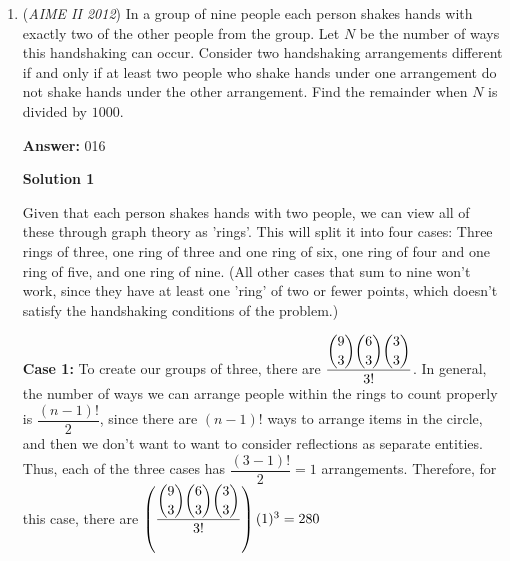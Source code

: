 \begin{enumerate}
By symmetry, we have\begin{align*}\sum_{k=1}^{4}(CE_k)^2&=\sum_{k=1}^{2}\left(2x_k^2+2y_k^2-3\sqrt{37}y_k-3\sqrt{111}x_k+333\right)\\&=710-3\sqrt{37}(y_1+y_2)-3\sqrt{111}(x_1+x_2)\tag{1}\end{align*}
Subtracting the equation of $\omega$ from the equation of $\Omega$, we see that 
 \[-\sqrt{111}x-3\sqrt{37}y+\frac{111}{4}+\frac{333}{4}=100\iff \sqrt{111}x+3\sqrt{37}y=11\]Obtaining the expression for $x^2,y^2$ and substituting them back to the equation of $\omega$, we have\begin{gather*}\frac{4}{3}x^2-\frac{22\sqrt{111}}{333}x+C_1=0\\4y^2-\frac{66\sqrt{37}}{111}y+C_2=0\end{gather*}Hence, by Vieta's formula,
 \[x_1+x_2=\frac{11\sqrt{111}}{222},\quad y_1+y_2=\frac{33\sqrt{37}}{222}\]By $(1)$, we have
 \[\sum_{k=1}^{4}(CE_k)^2=710-3\sqrt{37}\cdot \frac{33\sqrt{37}}{222}-3\sqrt{111}\cdot\frac{11\sqrt{111}}{222}=\boxed{677}\]



	\item (\textit{AIME II 2012}) In a group of nine people each person shakes hands with exactly two of the other people from the group. Let $N$ be the number of ways this handshaking can occur. Consider two handshaking arrangements different if and only if at least two people who shake hands under one arrangement do not shake hands under the other arrangement. Find the remainder when $N$ is divided by $1000$.


 
 \textbf{Answer: }016



\textbf{Solution 1}

Given that each person shakes hands with two people, we can view all of these through graph theory as 'rings'.  This will split it into four cases:  Three rings of three, one ring of three and one ring of six, one ring of four and one ring of five, and one ring of nine. (All other cases that sum to nine won't work, since they have at least one 'ring' of two or fewer points, which doesn't satisfy the handshaking conditions of the problem.)

 \textbf{Case 1:}   To create our groups of three, there are $\dfrac{\dbinom{9}{3}\dbinom{6}{3}\dbinom{3}{3}}{3!}$.  In general, the number of ways we can arrange people within the rings to count properly is $\dfrac{(n-1)!}{2}$, since there are $(n-1)!$ ways to arrange items in the circle, and then we don't want to want to consider reflections as separate entities.  Thus, each of the three cases has $\dfrac{(3-1)!}{2}=1$ arrangements.  Therefore, for this case, there are $\left(\dfrac{\dbinom{9}{3}\dbinom{6}{3}\dbinom{3}{3}}{3!}\right)(1)^3=280$


\end{enumerate}
